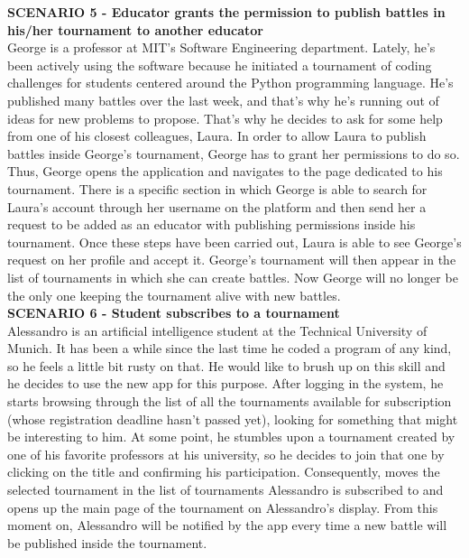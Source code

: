 	\textbf{SCENARIO 5 - Educator grants the permission to publish battles in his/her tournament to another educator}\\
	George is a professor at MIT's Software Engineering department. Lately, he's been actively using the \app software because he initiated a tournament of coding challenges for students centered around the Python programming language. He's published many battles over the last week, and that's why he's running out of ideas for new problems to propose. That's why he decides to ask for some help from one of his closest colleagues, Laura. In order to allow Laura to publish battles inside George's tournament, George has to grant her permissions to do so. Thus, George opens the \app application and navigates to the page dedicated to his tournament. There is a specific section in which George is able to search for Laura's account through her username on the platform and then send her a request to be added as an educator with publishing permissions inside his tournament. Once these steps have been carried out, Laura is able to see George's request on her profile and accept it. George's tournament will then appear in the list of tournaments in which she can create battles. Now George will no longer be the only one keeping the tournament alive with new battles.\\

    \textbf{SCENARIO 6 - Student subscribes to a tournament}\\
    Alessandro is an artificial intelligence student at the Technical University of Munich. It has been a while since the last time he coded a program of any kind, so he feels a little bit rusty on that. He would like to brush up on this skill and he decides to use the new app \app for this purpose.
    After logging in the system, he starts browsing through the list of all the tournaments available for subscription (whose registration deadline hasn't passed yet), looking for something that might be interesting to him. 
    At some point, he stumbles upon a tournament created by one of his favorite professors at his university, so he decides to join that one by clicking on the title and confirming his participation. Consequently, \app moves the selected tournament in the list of tournaments Alessandro is subscribed to and opens up the main page of the tournament on Alessandro's display.
    From this moment on, Alessandro will be notified by the \app app every time a new battle will be published inside the tournament.\\

